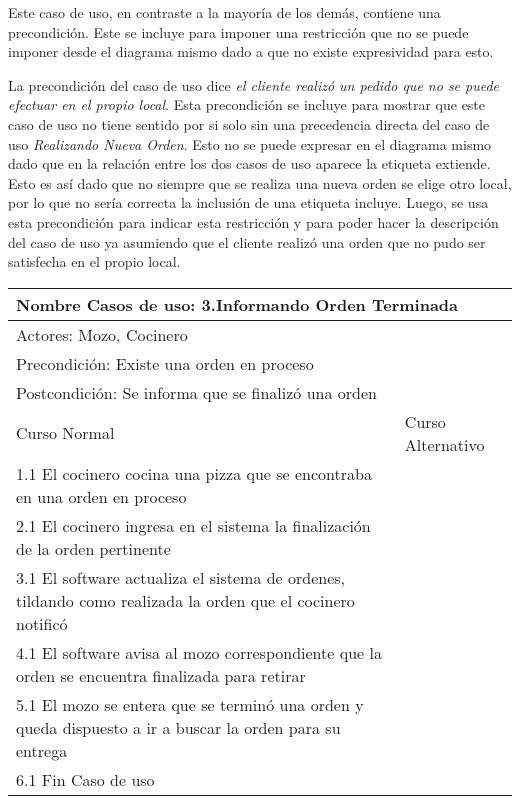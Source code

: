 \documentclass[a4paper,10pt]{article}
\begin{document}
Este caso de uso, en contraste a la mayor\'ia de los dem\'as, contiene una precondici\'on. Este se incluye para imponer una restricci\'on que no
se puede imponer desde el diagrama mismo dado a que no existe expresividad para esto. 

La precondici\'on del caso de uso dice \emph{el cliente realiz\'o un pedido que no se puede efectuar en el propio local}.
Esta precondici\'on se incluye para mostrar que este caso de uso no tiene sentido por si solo sin una precedencia directa del caso de uso
\emph{Realizando Nueva Orden}. Esto no se puede expresar en el diagrama mismo dado que  en la relaci\'on entre los dos casos de uso 
aparece la etiqueta extiende. Esto es as\'i dado que no siempre que se realiza una nueva orden se elige otro local, por lo que no ser\'ia correcta
la inclusi\'on de una etiqueta incluye. Luego, se usa esta precondici\'on para indicar esta restricci\'on y para poder hacer la descripci\'on del caso de uso
ya asumiendo que el cliente realiz\'o una orden que no pudo ser satisfecha en el propio local.

\bigskip

\begin{center}
\begin{tabularx}{14cm}{|X|X|}
\hline
\multicolumn{2}{|l|}{Nombre Casos de uso: 3.Informando Orden Terminada}\\
\hline
\multicolumn{2}{|l|}{Actores: Mozo, Cocinero}\\
\hline
\multicolumn{2}{|l|}{Precondici\'on: Existe una orden en proceso}\\
\hline
\multicolumn{2}{|l|}{Postcondici\'on: Se informa que se finaliz\'o una orden}\\
\hline
Curso Normal & Curso Alternativo\\
\hline
1.1 El cocinero cocina una pizza que se encontraba en una orden en proceso & 
\\
\hline
2.1 El cocinero ingresa en el sistema la finalizaci\'on de la orden pertinente & 
\\
\hline
3.1 El software actualiza el sistema de ordenes, tildando como realizada la orden que el cocinero notific\'o &
\\
\hline
4.1 El software avisa al mozo correspondiente que la orden se encuentra finalizada para retirar &
\\
\hline
5.1 El mozo se entera que se termin\'o una orden y queda dispuesto a ir a buscar la orden para su entrega &
\\
\hline
6.1 Fin Caso de uso &
\\
\hline
\end{tabularx}
\end{center}
\end{document}
